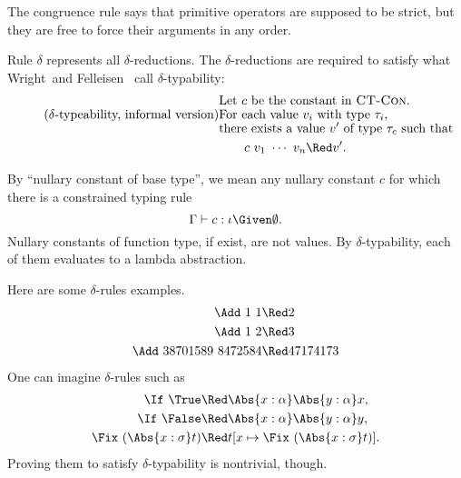 \documentclass{amsart}
\theoremstyle{definition}
\begin{document}
The congruence rule  says that primitive operators
are supposed to be strict, but they are free to force their
arguments in any order.

Rule \textsc{$\delta$} represents all $\delta$-reductions. The
$\delta$-reductions are required to satisfy what
Wright~and Felleisen~\cite{Wright94} call $\delta$-typability:
\begin{align*}
&\text{Let $c$ be the constant in \textsc{CT-Con}.}\\[-4pt]
\tag{$\delta$-typeability, informal version}\label{delta-typability}
&\text{For each value $v_i$ with type $\tau_i$,}\\[-4pt]
&\text{there exists a value $v'$ of type $\tau_c$ such that}\\
&\hspace{2em}c~v_1~\cdots~v_n\Red v'.
\end{align*}

By ``nullary constant of base type'', we mean any nullary
constant $c$ for which there is a constrained typing rule
\[
\Gamma\vdash c:\iota\Given\emptyset.
\]
Nullary constants of function type, if exist, are not values. By
$\delta$-typability, each of them evaluates to a lambda
abstraction.

Here are some $\delta$-rules examples.
\begin{align*}
\Add~1~1&\Red2\\
\Add~1~2&\Red3\\
\Add~38701589~8472584&\Red47174173
\end{align*}
One can imagine $\delta$-rules such as
\begin{align*}
\If~\True &\Red\Abs{x:\alpha}\Abs{y:\alpha}x,\\
\If~\False&\Red\Abs{x:\alpha}\Abs{y:\alpha}y,\\
\Fix~(\Abs{x:\sigma} t)&\Red t[x\mapsto \Fix~(\Abs{x:\sigma} t)].
\end{align*}
Proving them to satisfy $\delta$-typability is nontrivial,
though.




\end{document}
